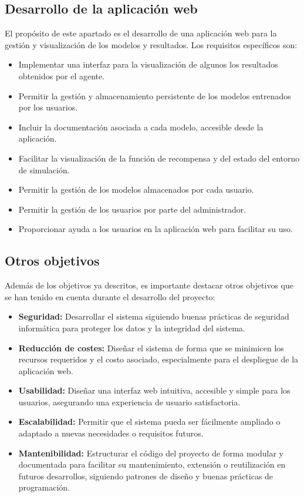 \subsection{Desarrollo de la aplicación web}
El propósito de este apartado es el desarrollo de una aplicación web para la gestión y visualización de los modelos y resultados. Los requisitos específicos son:
\begin{itemize}
    \item Implementar una interfaz para la visualización de algunos los resultados obtenidos por el agente.
    \item Permitir la gestión y almacenamiento persistente de los modelos entrenados por los usuarios.
    \item Incluir la documentación asociada a cada modelo, accesible desde la aplicación.
    \item Facilitar la visualización de la función de recompensa y del estado del entorno de simulación.
    \item Permitir la gestión de los modelos almacenados por cada usuario.
    \item Permitir la gestión de los usuarios por parte del administrador.
    \item Proporcionar ayuda a los usuarios en la aplicación web para facilitar su uso.
\end{itemize}

\subsection{Otros objetivos}
Además de los objetivos ya descritos, es importante destacar otros objetivos que se han tenido en cuenta durante el desarrollo del proyecto:
\begin{itemize}
    \item \textbf{Seguridad:} Desarrollar el sistema siguiendo buenas prácticas de seguridad informática para proteger los datos y la integridad del sistema.
    \item \textbf{Reducción de costes:} Diseñar el sistema de forma que se minimicen los recursos requeridos y el costo asociado, especialmente para el despliegue de la aplicación web.
    \item \textbf{Usabilidad:} Diseñar una interfaz web intuitiva, accesible y simple para los usuarios, asegurando una experiencia de usuario satisfactoria.
    \item \textbf{Escalabilidad:} Permitir que el sistema pueda ser fácilmente ampliado o adaptado a nuevas necesidades o requisitos futuros.
    \item \textbf{Mantenibilidad:} Estructurar el código del proyecto de forma modular y documentada para facilitar su mantenimiento, extensión o reutilización en futuros desarrollos, siguiendo patrones de diseño y buenas prácticas de programación.
\end{itemize}
